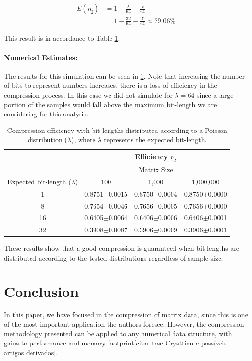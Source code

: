 \documentclass[10pt]{article}
\begin{document}
\begin{align}
 E(\eta_2) &= 1 - \frac{\lambda}{64} - \frac{k}{64} \label{eq:49} \\
 &= 1 - \frac{32}{64} - \frac{7}{64} \approx 39.06\% \label{eq:50}
\end{align}

This result is in accordance to Table \ref{tab:05}.
\paragraph{Numerical Estimates:}
The results for this simulation can be seen in \ref{tab:05}. Note that increasing the number of bits to represent numbers increases, there is a loss of efficiency in the compression process. In this case we did not simulate for $\lambda=64$ since a large portion of the samples would fall above the maximum bit-length we are considering for this analysis. 

 \begin{table}[h]
   \centering
   \caption{Compression efficiency with bit-lengths distributed according to a Poisson distribution ($\lambda$), where $\lambda$ represents the expected bit-length.}
  \begin{tabular}{cccc}
      \hline
      &&Efficiency $\eta_2$      & \\
      \hline
      &&Matrix Size& \\
      Expected bit-length ($\lambda$)	& 100	& 1,000		    & 1,000,000 \\
      \hline
      1 	& 0.8751$\pm$0.0015 	& 0.8750$\pm$0.0004 & 0.8750$\pm$0.0000 \\ 
      8 	& 0.7654$\pm$0.0046 	& 0.7656$\pm$0.0005 & 0.7656$\pm$0.0000 \\ 
      16 	& 0.6405$\pm$0.0064 	& 0.6406$\pm$0.0006 & 0.6406$\pm$0.0001 \\ 
      32 	& 0.3908$\pm$0.0087 	& 0.3906$\pm$0.0009 & 0.3906$\pm$0.0001 \\ 
      \hline
  \end{tabular}
  \label{tab:05}
 \end{table}

These results show that a good compression is guaranteed when bit-lengths are distributed according to the tested distributions regardless of sample size.

\section{Conclusion}
In this paper, we have focused in the compression of matrix data, since this is one of the most important application the authors foresee. However, the compression methodology presented can be applied to any numerical data structure, with gains to performance and memory footprint[citar tese Crysttian e possíveis artigos derivados]. 
\end{document}
